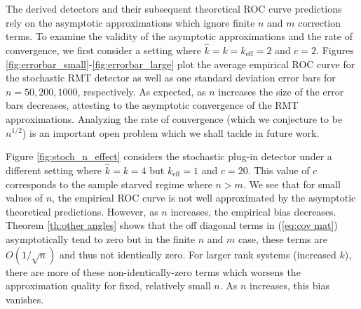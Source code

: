 The derived detectors and their subsequent theoretical ROC curve predictions rely on the asymptotic approximations which ignore finite $n$ and $m$ correction terms. To examine the validity of the asymptotic approximations and the rate of convergence, we first consider a setting where $\widehat{k}=k=k_\text{eff}=2$ and $c=2$. Figures \ref{fig:errorbar_small}-\ref{fig:errorbar_large} plot the average empirical ROC curve for the stochastic RMT detector as well as one standard deviation error bars for $n=50,200,1000$, respectively. As expected, as $n$ increases the size of the error bars decreases, attesting to the asymptotic convergence of the RMT approximations. Analyzing the rate of convergence (which we conjecture to be $n^{1/2}$) is an important open problem which we shall tackle in future work.

Figure \ref{fig:stoch_n_effect} considers the stochastic plug-in detector under a different setting where $\widehat{k}=k=4$ but $k_\text{eff}=1$ and $c=20$. This value of $c$ corresponds to the sample starved regime where $n > m$. We see that for small values of $n$, the empirical ROC curve is not well approximated by the asymptotic theoretical predictions. However, as $n$ increases, the empirical bias decreases. Theorem \ref{th:other angles} shows that the off diagonal terms in (\ref{eq:cov mat}) asymptotically tend to zero but in the finite $n$ and $m$ case, these terms are $O(1/\sqrt{n})$ and thus not identically zero. For larger rank systems (increased $k$), there are more of these non-identically-zero terms which worsens the approximation quality for fixed, relatively small $n$. As $n$ increases, this bias vanishes.

